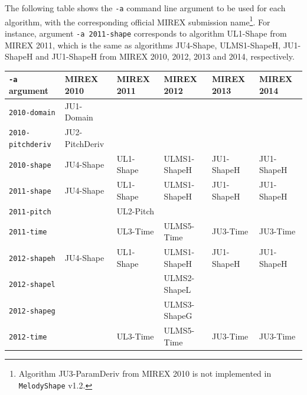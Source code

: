 \documentclass[twoside]{article}
\begin{document}
The following table shows the \texttt{-a} command line argument to be used for each algorithm, with the corresponding official MIREX submission name\footnote{Algorithm \textsf{JU3-ParamDeriv} from MIREX 2010 is not implemented in \texttt{MelodyShape} v1.2.}. For instance, argument \texttt{-a 2011-shape} corresponds to algorithm \textsf{UL1-Shape} from MIREX 2011, which is the same as algorithms \textsf{JU4-Shape}, \textsf{ULMS1-ShapeH}, \textsf{JU1-ShapeH} and \textsf{JU1-ShapeH} from MIREX 2010, 2012, 2013 and 2014, respectively.

\begin{table}[!h]\setlength{\tabcolsep}{4pt}
\small\centering\begin{tabular}{l|lllll}
	\hline
	\texttt{-a} argument     & MIREX 2010              & MIREX 2011         & MIREX 2012               & MIREX 2013             & MIREX 2014             \\ \hline
	\texttt{2010-domain}     & \textsf{JU1-Domain}     &                    &                          &                        &  \\
	\texttt{2010-pitchderiv} & \textsf{JU2-PitchDeriv} &                    &                          &                        &  \\
	\texttt{2010-shape}      & \textsf{JU4-Shape}      & \textsf{UL1-Shape} & \textsf{ULMS1-ShapeH}    & \textsf{JU1-ShapeH}    & \textsf{JU1-ShapeH}    \\ \hline
	\texttt{2011-shape}      & \textsf{JU4-Shape}      & \textsf{UL1-Shape} & \textsf{ULMS1-ShapeH}    & \textsf{JU1-ShapeH}    & \textsf{JU1-ShapeH}    \\
	\texttt{2011-pitch}      &                         & \textsf{UL2-Pitch} &                          &                        &  \\
	\texttt{2011-time}       &                         & \textsf{UL3-Time}  & \textsf{ULMS5-Time}      & \textsf{JU3-Time}      & \textsf{JU3-Time}      \\ \hline
	\texttt{2012-shapeh}     & \textsf{JU4-Shape}      & \textsf{UL1-Shape} & \textsf{ULMS1-ShapeH}    & \textsf{JU1-ShapeH}    & \textsf{JU1-ShapeH}    \\
	\texttt{2012-shapel}     &                         &                    & \textsf{ULMS2-ShapeL}    &                        &  \\
	\texttt{2012-shapeg}     &                         &                    & \textsf{ULMS3-ShapeG}    &                        &  \\
	\texttt{2012-time}       &                         & \textsf{UL3-Time}  & \textsf{ULMS5-Time}      & \textsf{JU3-Time}      & \textsf{JU3-Time}      \\

\end{tabular}
\end{table}
\end{document}
